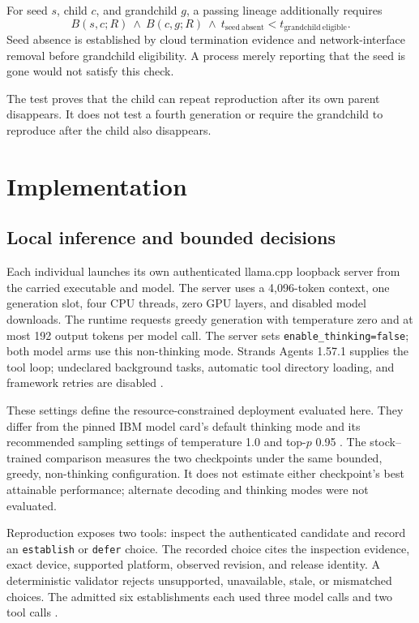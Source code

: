 \documentclass[11pt,letterpaper]{article}
\begin{document}
For seed $s$, child $c$, and grandchild $g$, a passing lineage additionally
requires
\[
B(s,c;R)\ \land\ B(c,g;R)\ \land\
t_{\mathrm{seed\ absent}} < t_{\mathrm{grandchild\ eligible}}.
\]
Seed absence is established by cloud termination evidence and network-interface
removal before grandchild eligibility. A process merely reporting that the seed
is gone would not satisfy this check.

The test proves that the child can repeat reproduction after its own parent
disappears. It does not test a fourth generation or require the grandchild to
reproduce after the child also disappears.

\section{Implementation}

\subsection{Local inference and bounded decisions}

Each individual launches its own authenticated llama.cpp
loopback server from the carried executable and model. The server uses a
4,096-token context, one generation slot, four CPU threads, zero GPU layers,
and disabled model downloads. The runtime requests greedy generation with
temperature zero and at most 192 output tokens per model call. The server
sets \texttt{enable\_thinking=false}; both model arms use this non-thinking
mode. Strands Agents
1.57.1 supplies the tool loop; undeclared background tasks, automatic tool
directory loading, and framework retries are disabled
\cite{implementation}.

These settings define the resource-constrained deployment evaluated here.
They differ from the pinned IBM model card's default thinking mode and its
recommended sampling settings of temperature 1.0 and top-$p$ 0.95
\cite{granite}. The stock--trained comparison measures the two checkpoints
under the same bounded, greedy, non-thinking configuration. It does not
estimate either checkpoint's best attainable performance; alternate decoding
and thinking modes were not evaluated.

Reproduction exposes two tools: inspect the authenticated candidate and record
an \texttt{establish} or \texttt{defer} choice. The recorded choice cites the
inspection evidence, exact device, supported platform, observed revision, and
release identity. A deterministic validator rejects unsupported, unavailable,
stale, or mismatched choices. The admitted six establishments each used three
model calls and two tool calls \cite{measurements}.
\end{document}
